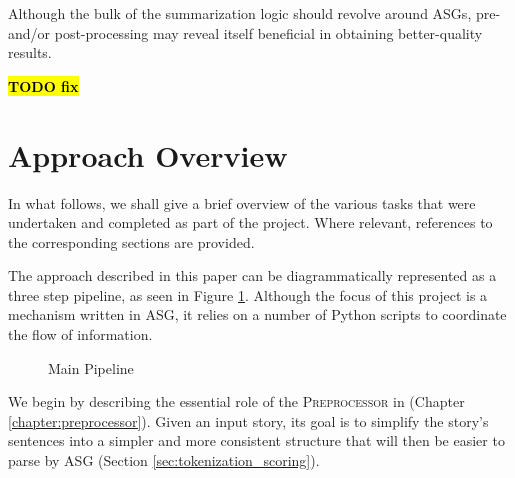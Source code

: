 Although the bulk of the summarization logic should revolve around ASGs, pre- and/or post-processing may reveal itself beneficial in obtaining better-quality results.

%

\textcolor{red}{\textbf{\hl{TODO fix}}}

\section{Approach Overview}

In what follows, we shall give a brief overview of the various tasks that were undertaken and completed as part of the project. Where relevant, references to the corresponding sections are provided.

The approach described in this paper can be diagrammatically represented as a three step pipeline, as seen in Figure \ref{fig:main_pipeline}. Although the focus of this project is a mechanism written in ASG, it relies on a number of Python scripts to coordinate the flow of information.

\begin{figure}[H]
\centering
{}
\caption{Main Pipeline}
\label{fig:main_pipeline}
\end{figure}

We begin by describing the essential role of the \textsc{Preprocessor} in (Chapter \ref{chapter:preprocessor}). Given an input story, its goal is to simplify the story's sentences into a simpler and more consistent structure that will then be easier to parse by ASG (Section \ref{sec:tokenization_scoring}).

